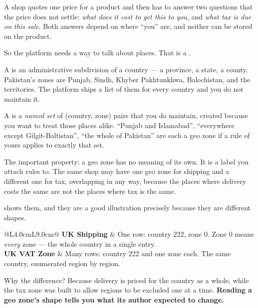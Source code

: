 A shop quotes one price for a product and then has to answer two questions that
the price does not settle: \emph{what does it cost to get this to you}, and
\emph{what tax is due on this sale}. Both answers depend on where ``you'' are,
and neither can be stored on the product.

So the platform needs a way to talk about places. That is a .

\begin{definitionbox}
A  is an administrative subdivision of a country --- a province, a
state, a county. Pakistan's zones are Punjab, Sindh, Khyber Pakhtunkhwa,
Balochistan, and the territories. The platform ships a list of them for every
country and you do not maintain it.

\smallskip
A  is a \emph{named set} of (country, zone) pairs that you do
maintain, created because you want to treat those places alike. ``Punjab and
Islamabad'', ``everywhere except Gilgit-Baltistan'', ``the whole of Pakistan''
are each a geo zone if a rule of yours applies to exactly that set.

\smallskip
The important property: a geo zone has no meaning of its own. It is a label you
attach rules to. The same shop may have one geo zone for shipping and a
different one for tax, overlapping in any way, because the places where
delivery costs the same are not the places where tax is the same.
\end{definitionbox}

\begin{examplebox}
 shows them, and they are a good
illustration precisely because they are different shapes.

\smallskip
\begin{tabular}{@{}L{4.0cm}L{9.0cm}@{}}
\textbf{UK Shipping} & One row: country 222, zone 0. Zone 0 means
\emph{every} zone --- the whole country in a single entry. \\[3pt]
\textbf{UK VAT Zone} & Many rows: country 222 and one zone each. The same
country, enumerated region by region. \\
\end{tabular}

\smallskip
Why the difference? Because delivery is priced for the country as a whole,
while the tax zone was built to allow regions to be excluded one at a time.
\textbf{Reading a geo zone's shape tells you what its author expected to
change.}
\end{examplebox}

